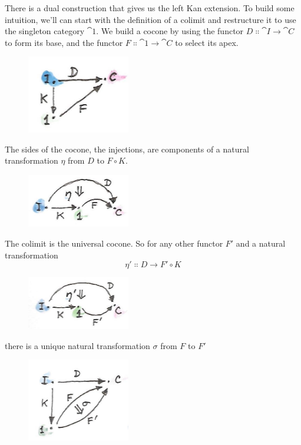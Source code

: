 There is a dual construction that gives us the left Kan extension. To
build some intuition, we'll can start with the definition of a colimit
and restructure it to use the singleton category $\cat{1}$. We build a
cocone by using the functor $D \Colon \cat{I} \to \cat{C}$ to form its
base, and the functor $F \Colon \cat{1} \to \cat{C}$ to select its apex.

\begin{figure}[H]
\centering
\includegraphics[width=0.4\textwidth]{images/kan81.jpg}
\end{figure}

\noindent
The sides of the cocone, the injections, are components of a natural
transformation $\eta$ from $D$ to $F \circ K$.

\begin{figure}[H]
\centering
\includegraphics[width=0.4\textwidth]{images/kan10a.jpg}
\end{figure}

\noindent
The colimit is the universal cocone. So for any other functor
$F'$ and a natural transformation
\[\eta' \Colon D \to F' \circ K\]

\begin{figure}[H]
\centering
\includegraphics[width=0.4\textwidth]{images/kan10b.jpg}
\end{figure}

\noindent
there is a unique natural transformation $\sigma$ from $F$ to $F'$

\begin{figure}[H]
\centering
\includegraphics[width=0.4\textwidth]{images/kan14.jpg}
\end{figure}

